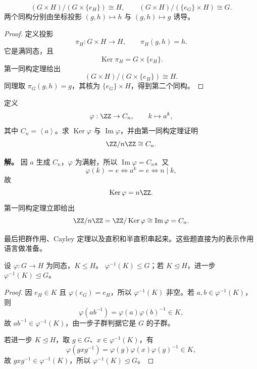 \par

\par

\par
\begin{proposition}[直积的商群]

\[
(G\times H)/(G\times\{e_H\})\cong H,
\qquad
(G\times H)/(\{e_G\}\times H)\cong G.
\]
两个同构分别由坐标投影 $(g,h)\mapsto h$ 与 $(g,h)\mapsto g$ 诱导。
\end{proposition}

\begin{proof}
定义投影
\[
\pi_H:G\times H\to H,
\qquad
\pi_H(g,h)=h.
\]
它是满同态，且
\[
\operatorname{Ker}\pi_H=G\times\{e_H\}.
\]
第一同构定理给出
\[
(G\times H)/(G\times\{e_H\})\cong H.
\]
同理取 $\pi_G(g,h)=g$，其核为 $\{e_G\}\times H$，得到第二个同构。
\end{proof}
\par

\par
\begin{workedexample}[第一同构定理的计算例]
定义
\[
\varphi:\ZZ\to C_n,
\qquad
k\mapsto a^k,
\]
其中 $C_n=\left\langle a\right\rangle$。求 $\operatorname{Ker}\varphi$ 与 $\operatorname{Im}\varphi$，并由第一同构定理证明
\[
\ZZ/n\ZZ\cong C_n.
\]

\textbf{解。} 因 $a$ 生成 $C_n$，$\varphi$ 为满射，所以 $\operatorname{Im}\varphi=C_n$。又
\[
\varphi(k)=e
\Longleftrightarrow a^k=e
\Longleftrightarrow n\mid k,
\]
故
\[
\operatorname{Ker}\varphi=n\ZZ.
\]
第一同构定理立即给出
\[
\ZZ/n\ZZ
=\ZZ/\operatorname{Ker}\varphi
\cong\operatorname{Im}\varphi=C_n.
\]

最后把群作用、Cayley 定理以及直积和半直积串起来。这些题直接为的表示作用语言做准备。
\end{workedexample}
\par

\par
\begin{proposition}[核的逆像描述]
设 $\varphi:G\to H$ 为同态，$K\leqslant H$。 $\varphi^{-1}(K)\leqslant G$；若 $K\mathrel{\trianglelefteq} H$，进一步 $\varphi^{-1}(K)\mathrel{\trianglelefteq} G$。
\end{proposition}

\begin{proof}
因 $e_H\in K$ 且 $\varphi(e_G)=e_H$，所以 $\varphi^{-1}(K)$ 非空。若 $a,b\in\varphi^{-1}(K)$，则
\[
\varphi(ab^{-1})=\varphi(a)\varphi(b)^{-1}\in K,
\]
故 $ab^{-1}\in\varphi^{-1}(K)$，由一步子群判据它是 $G$ 的子群。

若进一步 $K\mathrel{\trianglelefteq} H$，取 $g\in G$、$x\in\varphi^{-1}(K)$，有
\[
\varphi(gxg^{-1})
=\varphi(g)\varphi(x)\varphi(g)^{-1}\in K,
\]
故 $gxg^{-1}\in\varphi^{-1}(K)$，所以 $\varphi^{-1}(K)\mathrel{\trianglelefteq} G$。
\end{proof}
\par

